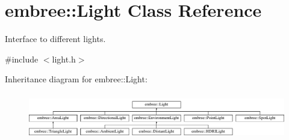 \hypertarget{classembree_1_1_light}{
\section{embree::Light Class Reference}
\label{classembree_1_1_light}
}


Interface to different lights.  




{\ttfamily \#include $<$light.h$>$}

Inheritance diagram for embree::Light:\begin{figure}[H]
\begin{center}
\leavevmode
\includegraphics[height=2.036364cm]{classembree_1_1_light}
\end{center}
\end{figure}
